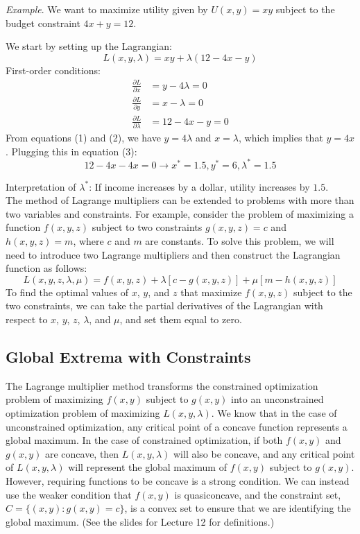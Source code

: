 \documentclass{./../Latex/handout}
\begin{document}
\textit{Example}. We want to maximize utility given by  $U(x,y) = x y$ subject to the budget constraint $4 x + y = 12$. 

We start by setting up the Lagrangian:
$$ L(x, y, \lambda) = x y + \lambda(12-4x-y) $$
First-order conditions:
\begin{align}
\frac{\partial L}{\partial x} &= y- 4 \lambda = 0  \\ 
\frac{\partial L}{\partial y} &= x- \lambda  = 0 \\ 
\frac{\partial L}{\partial \lambda} &= 12-4x-y = 0 
\end{align}
From equations (1) and (2), we have $y=4 \lambda$ and $x=\lambda$, which implies that $y=4x$. Plugging this in equation (3):
$$ 12-4x-4x = 0 \rightarrow x^* = 1.5, y^*=6, \lambda^* = 1.5 $$

Interpretation of $\lambda^*$: If income increases by a dollar, utility increases by $1.5$.\\

The method of Lagrange multipliers can be extended to problems with more than two variables and constraints. For example, consider the problem of maximizing a function $f(x,y,z)$ subject to two constraints $g(x,y,z) = c$ and $h(x,y,z) = m$, where $c$ and $m$ are constants. To solve this problem, we will need to introduce two Lagrange multipliers and then construct the Lagrangian function as follows:
$$L(x,y,z,\lambda,\mu) = f(x,y,z) + \lambda [c-g(x,y,z)] + \mu [m-h(x,y,z)]$$
To find the optimal values of $x$, $y$, and $z$ that maximize $f(x,y,z)$ subject to the two constraints, we can take the partial derivatives of the Lagrangian with respect to $x$, $y$, $z$, $\lambda$, and $\mu$, and set them equal to zero. 

\subsection*{Global Extrema with Constraints}

The Lagrange multiplier method transforms the constrained optimization problem of maximizing $f(x,y)$ subject to $g(x,y)$ into an unconstrained optimization problem of maximizing $ L(x, y, \lambda)$. We know that in the case of unconstrained optimization, any critical point of a concave function represents a global maximum. In the case of constrained optimization, if both $f(x,y)$ and $g(x,y)$ are concave, then $L(x,y,\lambda)$ will also be concave, and any critical point of $L(x,y,\lambda)$ will represent the global maximum of $f(x,y)$ subject to $g(x,y)$. However, requiring functions to be concave is a strong condition. We can instead use the weaker condition that $f(x,y)$ is quasiconcave, and the constraint set, $C=\{(x,y):g(x,y)=c\}$, is a convex set to ensure that we are identifying the global maximum. (See the slides for Lecture 12 for definitions.) \\
\end{document}
